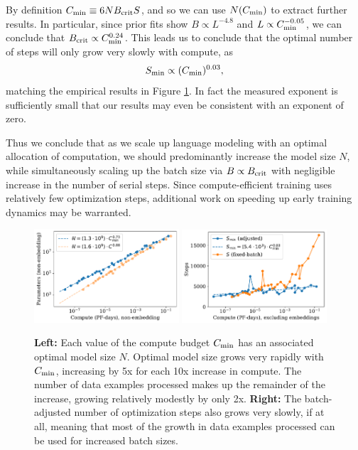 \documentclass[english]{article}
\newcommand{\be}{\begin{equation}}
\newcommand{\ee}{\end{equation}}
\begin{document}
By definition $C_{\rm min} \equiv 6 N B_{\rm crit} S$, and so we can use $N(C_{\rm min})$ to extract further results.  In particular, since prior fits show $B \propto L^{-4.8}$ and $L \propto C_{\rm min}^{-0.05}$, we can conclude that $B_{\rm crit} \propto C_{\rm min}^{0.24}$.  This leads us to conclude that the optimal number of steps will only grow very slowly with compute, as
\be
S_{\rm min} \propto (C_{\rm min})^{0.03},
\ee
matching the empirical results in Figure \ref{fig:ComputevsPerformance}.  In fact the measured exponent is sufficiently small that our results may even be consistent with an exponent of zero.  

Thus we conclude that as we scale up language modeling with an optimal allocation of computation, we should predominantly increase the model size $N$, while simultaneously scaling up the batch size  via $B \propto B_{\rm crit}$ with negligible increase in the number of serial steps.  Since compute-efficient training uses relatively few optimization steps, additional work on speeding up early training dynamics may be warranted.


\begin{figure}
\noindent \centering{}
\includegraphics[width=0.48\textwidth]{ComputevsOptimalModelSize}\hfill
\includegraphics[width=0.48\textwidth]{ComputeEfficientSteps}
\caption[Optimal model size and serial number of steps versus compute budget]{
\textbf{Left:} Each value of the compute budget $C_{\rm min}$ has an associated optimal model size $N$.  Optimal model size grows very rapidly with $C_{\rm min}$, increasing by 5x for each 10x increase in compute.  The number of data examples processed makes up the remainder of the increase, growing relatively modestly by only 2x.
\textbf{Right:} The batch-adjusted number of optimization steps also grows very slowly, if at all, meaning that most of the growth in data examples processed can be used for increased batch sizes.
\label{fig:ComputevsPerformance}}
\end{figure}
\end{document}

